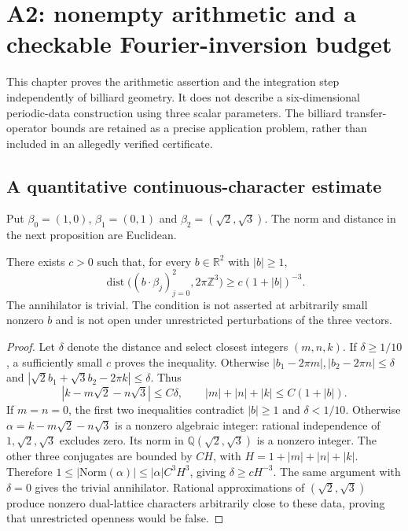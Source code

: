 \section{A2: nonempty arithmetic and a checkable Fourier-inversion budget}
\label{sec:r33-a2}

This chapter proves the arithmetic assertion and the integration step independently of billiard geometry. It does not describe a six-dimensional periodic-data construction using three scalar parameters. The billiard transfer-operator bounds are retained as a precise application problem, rather than included in an allegedly verified certificate.

\subsection{A quantitative continuous-character estimate}
Put $\beta_0=(1,0)$, $\beta_1=(0,1)$ and $\beta_2=(\sqrt2,\sqrt3)$. The norm and distance in the next proposition are Euclidean.

\begin{proposition}
\label{prop:r33-a2-arithmetic}
There exists $c>0$ such that, for every $b\in\mathbb R^2$ with $|b|\ge1$,
\[
 \operatorname{dist}\big((b\cdot\beta_j)_{j=0}^2,
                          2\pi\mathbb Z^3\big)
 \ge c(1+|b|)^{-3}.
\]
The annihilator is trivial. The condition is not asserted at arbitrarily small nonzero $b$ and is not open under unrestricted perturbations of the three vectors.
\end{proposition}

\begin{proof}
Let $\delta$ denote the distance and select closest integers $(m,n,k)$. If $\delta\ge1/10$, a sufficiently small $c$ proves the inequality. Otherwise $|b_1-2\pi m|,|b_2-2\pi n|\le\delta$ and
$|\sqrt2 b_1+\sqrt3 b_2-2\pi k|\le\delta$. Thus
\[
 |k-m\sqrt2-n\sqrt3|\le C\delta,\qquad
 |m|+|n|+|k|\le C(1+|b|).
\]
If $m=n=0$, the first two inequalities contradict $|b|\ge1$ and $\delta<1/10$. Otherwise $\alpha=k-m\sqrt2-n\sqrt3$ is a nonzero algebraic integer: rational independence of $1,\sqrt2,\sqrt3$ excludes zero. Its norm in $\mathbb Q(\sqrt2,\sqrt3)$ is a nonzero integer. The other three conjugates are bounded by $CH$, with $H=1+|m|+|n|+|k|$. Therefore $1\le|\mathrm{Norm}(\alpha)|\le|\alpha|C^3H^3$, giving $\delta\ge cH^{-3}$. The same argument with $\delta=0$ gives the trivial annihilator. Rational approximations of $(\sqrt2,\sqrt3)$ produce nonzero dual-lattice characters arbitrarily close to these data, proving that unrestricted openness would be false.
\end{proof}

